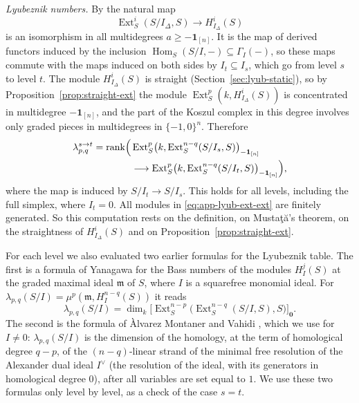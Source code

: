 \documentclass[11pt]{article}
\theoremstyle{plain}
\theoremstyle{definition}
\begin{document}
\emph{Lyubeznik numbers.} By \cite[Theorem~1.1]{Mustata} the natural map
\[
 \operatorname{Ext}^i_S(S/I_\Delta,S)\longrightarrow H^{i}_{I_\Delta}(S)
\]
is an isomorphism in all multidegrees $a\ge-\mathbf 1_{[n]}$. It is the map of derived functors induced by the inclusion $\operatorname{Hom}_S(S/I,-)\subseteq\Gamma_I(-)$, so these maps commute with the maps induced on both sides by $I_t\subseteq I_s$, which go from level $s$ to level $t$. The module $H^{i}_{I_\Delta}(S)$ is straight (Section~\ref{sec:lyub-static}), so by Proposition~\ref{prop:straight-ext} the module $\operatorname{Ext}^p_S(k,H^{i}_{I_\Delta}(S))$ is concentrated in multidegree $-\mathbf 1_{[n]}$, and the part of the Koszul complex in this degree involves only graded pieces in multidegrees in $\{-1,0\}^n$. Therefore
\begin{equation}\label{eq:app-lyub-ext-ext}
\begin{aligned}
 \lambda^{s\to t}_{p,q}=\operatorname{rank}\Bigl(&\operatorname{Ext}^p_S\bigl(k,\operatorname{Ext}^{n-q}_S(S/I_s,S)\bigr)_{-\mathbf 1_{[n]}}\\
 &\longrightarrow\operatorname{Ext}^p_S\bigl(k,\operatorname{Ext}^{n-q}_S(S/I_t,S)\bigr)_{-\mathbf 1_{[n]}}\Bigr),
\end{aligned}
\end{equation}
where the map is induced by $S/I_t\to S/I_s$. This holds for all levels, including the full simplex, where $I_t=0$. All modules in \eqref{eq:app-lyub-ext-ext} are finitely generated. So this computation rests on the definition, on Musta\c{t}\u{a}'s theorem, on the straightness of $H^{i}_{I_\Delta}(S)$ and on Proposition~\ref{prop:straight-ext}.

For each level we also evaluated two earlier formulas for the Lyubeznik table. The first is a formula of Yanagawa \cite[Theorem~1.1 and Corollary~3.10]{Yanagawa2001} for the Bass numbers of the modules $H^{j}_{I}(S)$ at the graded maximal ideal $\mathfrak{m}$ of $S$, where $I$ is a squarefree monomial ideal. For $\lambda_{p,q}(S/I)=\mu^p(\mathfrak{m},H^{n-q}_{I}(S))$ it reads
\[
 \lambda_{p,q}(S/I)=\dim_k\bigl[\operatorname{Ext}^{n-p}_S\bigl(\operatorname{Ext}^{n-q}_S(S/I,S),S\bigr)\bigr]_{\mathbf 0}.
\]
The second is the formula of \`Alvarez Montaner and Vahidi \cite[Section~4]{AlvarezMontanerVahidi}, which we use for $I\ne0$: $\lambda_{p,q}(S/I)$ is the dimension of the homology, at the term of homological degree $q-p$, of the $(n-q)$-linear strand of the minimal free resolution of the Alexander dual ideal $I^\vee$ (the resolution of the ideal, with its generators in homological degree $0$), after all variables are set equal to $1$. We use these two formulas only level by level, as a check of the case $s=t$.
\end{document}
